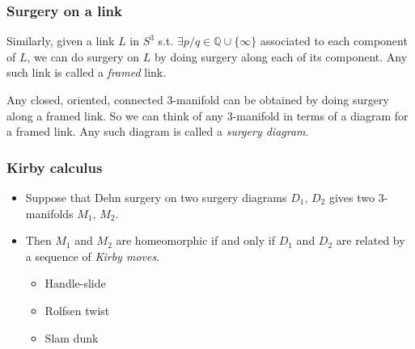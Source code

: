 \documentclass{beamer}
\theoremstyle{ex}
\theoremstyle{rem}
\begin{document}
	

	\begin{frame}
	\frametitle{Surgery on a link}
		\begin{definition}
		Similarly, given a link $L$ in $S^3$ s.t. $\exists p/q \in \mathbb{Q}\cup\{\infty\}$ associated to each component of $L$, we can do surgery on $L$ by doing surgery along each of its component. Any such link is called a \textit{framed} link. 
		\end{definition}
	
	
		\begin{theorem}
		Any closed, oriented, connected $3$-manifold can be obtained by doing surgery along a framed link. So we can think of any $3$-manifold in terms of a diagram for a framed link. Any such diagram is called a \textit{surgery diagram}. 
		\end{theorem}
		
	\end{frame}
	
	\begin{frame}
		\frametitle{Kirby calculus}
		\begin{itemize}
			\item Suppose that Dehn surgery on two surgery diagrams $D_1$, $D_2$ gives two $3$-manifolds $M_1$, $M_2$.
			\item Then $M_1$ and $M_2$ are homeomorphic if and only if $D_1$ and $D_2$ are related by a sequence of \textit{Kirby moves}.
			\begin{itemize}
				\item Handle-slide
				\item Rolfsen twist
				\item Slam dunk
			\end{itemize}
		\end{itemize}
	\end{frame}
	
\end{document}
